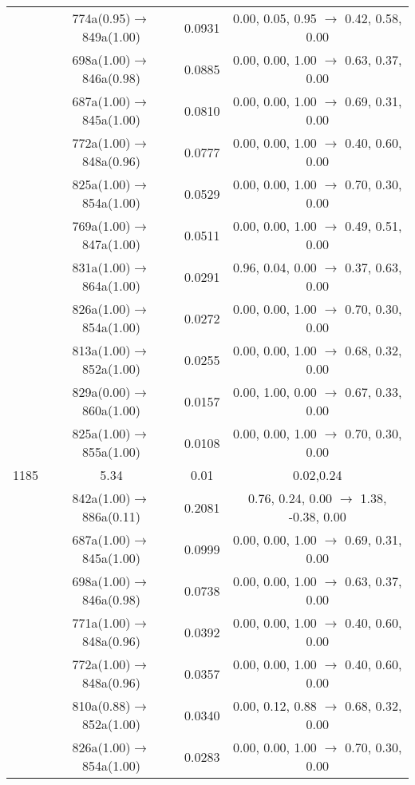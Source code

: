 \documentclass[10pt,a4paper]{article}
\begin{document}
\begin{longtable}{c|c|c|c}
 	& 774a(0.95)$\rightarrow$849a(1.00) &	 0.0931 &	 0.00, 0.05, 0.95 $\rightarrow$ 0.42, 0.58, 0.00 \\ 
 	& 698a(1.00)$\rightarrow$846a(0.98) &	 0.0885 &	 0.00, 0.00, 1.00 $\rightarrow$ 0.63, 0.37, 0.00 \\ 
 	& 687a(1.00)$\rightarrow$845a(1.00) &	 0.0810 &	 0.00, 0.00, 1.00 $\rightarrow$ 0.69, 0.31, 0.00 \\ 
 	& 772a(1.00)$\rightarrow$848a(0.96) &	 0.0777 &	 0.00, 0.00, 1.00 $\rightarrow$ 0.40, 0.60, 0.00 \\ 
 	& 825a(1.00)$\rightarrow$854a(1.00) &	 0.0529 &	 0.00, 0.00, 1.00 $\rightarrow$ 0.70, 0.30, 0.00 \\ 
 	& 769a(1.00)$\rightarrow$847a(1.00) &	 0.0511 &	 0.00, 0.00, 1.00 $\rightarrow$ 0.49, 0.51, 0.00 \\ 
 	& 831a(1.00)$\rightarrow$864a(1.00) &	 0.0291 &	 0.96, 0.04, 0.00 $\rightarrow$ 0.37, 0.63, 0.00 \\ 
 	& 826a(1.00)$\rightarrow$854a(1.00) &	 0.0272 &	 0.00, 0.00, 1.00 $\rightarrow$ 0.70, 0.30, 0.00 \\ 
 	& 813a(1.00)$\rightarrow$852a(1.00) &	 0.0255 &	 0.00, 0.00, 1.00 $\rightarrow$ 0.68, 0.32, 0.00 \\ 
 	& 829a(0.00)$\rightarrow$860a(1.00) &	 0.0157 &	 0.00, 1.00, 0.00 $\rightarrow$ 0.67, 0.33, 0.00 \\ 
 	& 825a(1.00)$\rightarrow$855a(1.00) &	 0.0108 &	 0.00, 0.00, 1.00 $\rightarrow$ 0.70, 0.30, 0.00 \\ 
 \hline1185 &	 5.34 &	 0.01 &	 0.02,0.24 \\ 
  	& 842a(1.00)$\rightarrow$886a(0.11) &	 0.2081 &	 0.76, 0.24, 0.00 $\rightarrow$ 1.38, -0.38, 0.00 \\ 
 	& 687a(1.00)$\rightarrow$845a(1.00) &	 0.0999 &	 0.00, 0.00, 1.00 $\rightarrow$ 0.69, 0.31, 0.00 \\ 
 	& 698a(1.00)$\rightarrow$846a(0.98) &	 0.0738 &	 0.00, 0.00, 1.00 $\rightarrow$ 0.63, 0.37, 0.00 \\ 
 	& 771a(1.00)$\rightarrow$848a(0.96) &	 0.0392 &	 0.00, 0.00, 1.00 $\rightarrow$ 0.40, 0.60, 0.00 \\ 
 	& 772a(1.00)$\rightarrow$848a(0.96) &	 0.0357 &	 0.00, 0.00, 1.00 $\rightarrow$ 0.40, 0.60, 0.00 \\ 
 	& 810a(0.88)$\rightarrow$852a(1.00) &	 0.0340 &	 0.00, 0.12, 0.88 $\rightarrow$ 0.68, 0.32, 0.00 \\ 
 	& 826a(1.00)$\rightarrow$854a(1.00) &	 0.0283 &	 0.00, 0.00, 1.00 $\rightarrow$ 0.70, 0.30, 0.00 \\ 

\end{longtable}
\end{document}
